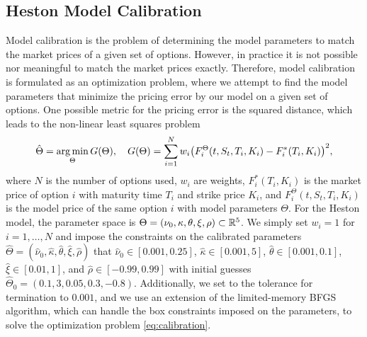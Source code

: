 \subsection{Heston Model Calibration}
Model calibration is the problem of determining the model parameters to match the market prices of a given set of options. However, in practice it is not possible nor meaningful to match the market prices exactly. Therefore, model calibration is formulated as an optimization problem, where we attempt to find the model parameters that minimize the pricing error by our model on a given set of options. One possible metric for the pricing error is the squared distance, which leads to the non-linear least squares problem
\begin{equation}\label{eq:calibration}
    \hat{\Theta}=\argmin_{\Theta}G(\Theta),\quad G(\Theta)= \sum_{i=1}^{N}w_{i}\left(F^{\Theta}_{i}(t,S_{t},T_{i},K_{i}) - F_{i}^{*}(T_{i},K_{i})\right)^{2},
\end{equation}
where $N$ is the number of options used, $w_{i}$ are weights, $F^{*}_{i}(T_{i},K_{i})$ is the market price of option $i$ with maturity time $T_{i}$ and strike price $K_{i}$, and $F^{\Theta}_{i}(t,S_{t},T_{i},K_{i})$ is the model price of the same option $i$ with model parameters $\Theta$. For the Heston model, the parameter space is $\Theta=(\nu_{0},\kappa,\theta,\xi,\rho)\subset \mathbb{R}^{5}$. We simply set $w_{i}=1$ for $i=1,\dots,N$ and impose the constraints on the calibrated parameters $\hat{\Theta}=(\hat{\nu}_{0},\hat{\kappa},\hat{\theta},\hat{\xi},\hat{\rho})$ that $\hat{\nu}_{0}\in [0.001, 0.25]$, $\hat{\kappa}\in [0.001, 5]$, $\hat{\theta}\in [0.001, 0.1]$, $\hat{\xi}\in [0.01, 1]$, and $\hat{\rho}\in [-0.99, 0.99]$ with initial guesses $\hat{\Theta}_{0}=(0.1, 3, 0.05, 0.3, -0.8)$. Additionally, we set to the tolerance for termination to $0.001$, and we use an extension of the limited-memory BFGS algorithm, which can handle the box constraints imposed on the parameters, to solve the optimization problem \eqref{eq:calibration}.
